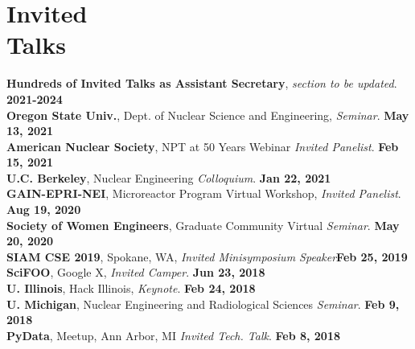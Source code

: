 \documentclass[margin,line]{resume}
\begin{document}
\begin{resume}
\begin{bibenum}
        \item {}
        \item {}
        \item {}
        \item {}
        \item {}
        \item {}
        \end{bibenum}
    \section{\mysidestyle Invited\\Talks}
      \textbf{Hundreds of Invited Talks as Assistant Secretary}, \emph{section to be updated}.  \hfill\textbf{2021-2024}\\
      \textbf{Oregon State Univ.}, Dept. of Nuclear Science and Engineering, \emph{Seminar}.  \hfill\textbf{May 13, 2021}\\
      \textbf{American Nuclear Society}, NPT at 50 Years Webinar \emph{Invited Panelist}.  \hfill\textbf{Feb 15, 2021}\\
      \textbf{U.C. Berkeley}, Nuclear Engineering \emph{Colloquium}.  \hfill\textbf{Jan 22, 2021}\\
      \textbf{GAIN-EPRI-NEI}, Microreactor Program Virtual Workshop, \emph{Invited Panelist}.  \hfill\textbf{Aug 19, 2020}\\
      \textbf{Society of Women Engineers}, Graduate Community Virtual \emph{Seminar}.  \hfill\textbf{May 20, 2020}\\
      \textbf{SIAM CSE 2019}, Spokane, WA, \emph{Invited Minisymposium Speaker}\hfill\textbf{Feb 25, 2019}\\
      \textbf{SciFOO}, Google X, \emph{Invited Camper}.  \hfill\textbf{Jun 23, 2018}\\
      \textbf{U. Illinois}, Hack Illinois, \emph{Keynote}.  \hfill\textbf{Feb 24, 2018}\\
      \textbf{U. Michigan}, Nuclear Engineering and Radiological Sciences \emph{Seminar}.  \hfill\textbf{Feb 9, 2018}\\
      \textbf{PyData}, Meetup, Ann Arbor, MI \emph{Invited Tech. Talk}.  \hfill\textbf{Feb 8, 2018}\\

\end{resume}
\end{document}
